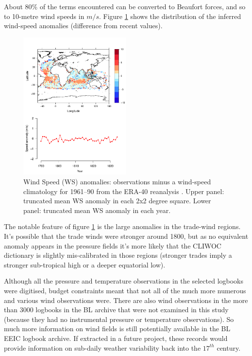 \documentclass[CP]{copernicus}
\begin{document}
About 80\% of the terms encountered can be converted to Beaufort forces, and so to 10-metre wind speeds in $m/s$. Figure \ref{pwat3} shows the distribution of the inferred wind-speed anomalies (difference from recent values).
\begin{figure}[!hbp]
\begin{center}
\includegraphics[angle=0, width=0.5\textwidth]{fig8.pdf}
\caption{Wind Speed (WS) anomalies: observations minus a wind-speed climatology for 1961--90 from the ERA-40 reanalysis \citep{uppala05reanalysis}. Upper panel: truncated mean WS anomaly in each 2x2 degree square. Lower panel: truncated mean WS anomaly in each year.}
\label{pwat3}
\end{center}
\end{figure}
The notable feature of figure \ref{pwat3} is the large anomalies in the trade-wind regions. It's possible that the trade winds were stronger around 1800, but as no equivalent anomaly appears in the pressure fields it's more likely that the CLIWOC dictionary is slightly mis-calibrated in those regions (stronger trades imply a stronger sub-tropical high or a deeper equatorial low).

Although all the pressure and temperature observations in the selected logbooks were digitised, budget constraints meant that not all of the much more numerous and various wind observations were. There are also wind observations in the more than 3000 logbooks in the BL archive that were not examined in this study (because they had no instrumental pressure or temperature observations). So much more information on wind fields is still potentially available in the BL EEIC logbook archive. If extracted in a future project, these records would provide information on sub-daily weather variability back into the $17^{th}$ century.
\end{document}
